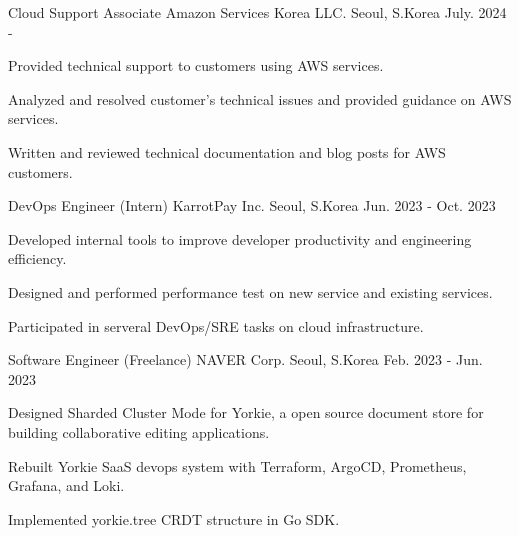 

\begin{cventries}

\cventry
    {Cloud Support Associate} %
    {Amazon Services Korea LLC.} %
    {Seoul, S.Korea} %
    {July. 2024 - } %
    {
      \begin{cvitems} %
        \item {Provided technical support to customers using AWS services.}
        \item {Analyzed and resolved customer's technical issues and provided guidance on AWS services.}
        \item {Written and reviewed technical documentation and blog posts for AWS customers.}
      \end{cvitems}
    }

\cventry
    {DevOps Engineer (Intern)} %
    {KarrotPay Inc.} %
    {Seoul, S.Korea} %
    {Jun. 2023 - Oct. 2023} %
    {
      \begin{cvitems} %
        \item {Developed internal tools to improve developer productivity and engineering efficiency.}
        \item {Designed and performed performance test on new service and existing services.}
        \item {Participated in serveral DevOps/SRE tasks on cloud infrastructure.}
      \end{cvitems}
    }

  \cventry
    {Software Engineer (Freelance)} %
    {NAVER Corp.} %
    {Seoul, S.Korea} %
    {Feb. 2023 - Jun. 2023} %
    {
      \begin{cvitems} %
        \item {Designed Sharded Cluster Mode for Yorkie, a open source document store for building collaborative editing applications.}
        \item {Rebuilt Yorkie SaaS devops system with Terraform, ArgoCD, Prometheus, Grafana, and Loki.}
        \item {Implemented yorkie.tree CRDT structure in Go SDK.}
      \end{cvitems}
    }


\end{cventries}
